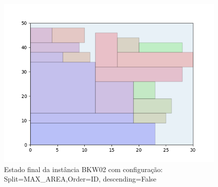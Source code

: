\begin{figure}[H]
    \centering
    \caption[]{Estado final da instância BKW02 com configuração: Split=MAX_AREA,Order=ID, descending=False}
    \label{fig:bkw02-max_area-id-false}
    \includegraphics[scale=0.5]{output/figures/bkw/bkw02/max_area/id/false/00}
\end{figure}